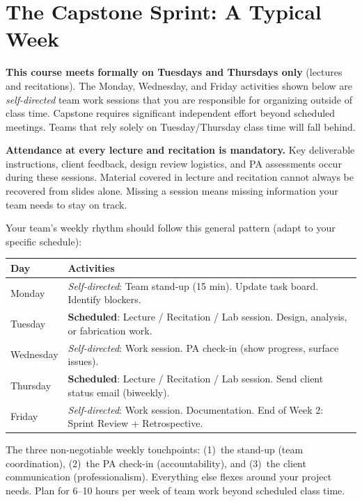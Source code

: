 \section{The Capstone Sprint: A Typical Week}

\begin{warnbox}
\textbf{This course meets formally on Tuesdays and Thursdays only} (lectures and recitations). The Monday, Wednesday, and Friday activities shown below are \emph{self-directed} team work sessions that you are responsible for organizing outside of class time. Capstone requires significant independent effort beyond scheduled meetings. Teams that rely solely on Tuesday/Thursday class time will fall behind.
\end{warnbox}

\begin{warnbox}
\textbf{Attendance at every lecture and recitation is mandatory.} Key deliverable instructions, client feedback, design review logistics, and PA assessments occur during these sessions. Material covered in lecture and recitation cannot always be recovered from slides alone. Missing a session means missing information your team needs to stay on track.
\end{warnbox}

Your team's weekly rhythm should follow this general pattern (adapt to your specific schedule):

\begin{center}\small
\begin{tabularx}{\textwidth}{lX}
\toprule
\textbf{Day} & \textbf{Activities} \\
\midrule
Monday & \textit{Self-directed}: Team stand-up (15 min). Update task board. Identify blockers. \\
Tuesday & \textbf{Scheduled}: Lecture / Recitation / Lab session. Design, analysis, or fabrication work. \\
Wednesday & \textit{Self-directed}: Work session. PA check-in (show progress, surface issues). \\
Thursday & \textbf{Scheduled}: Lecture / Recitation / Lab session. Send client status email (biweekly). \\
Friday & \textit{Self-directed}: Work session. Documentation. End of Week 2: Sprint Review + Retrospective. \\
\bottomrule
\end{tabularx}
\end{center}

\begin{protip}
The three non-negotiable weekly touchpoints: (1)~the stand-up (team coordination), (2)~the PA check-in (accountability), and (3)~the client communication (professionalism). Everything else flexes around your project needs. Plan for 6--10 hours per week of team work beyond scheduled class time.
\end{protip}


